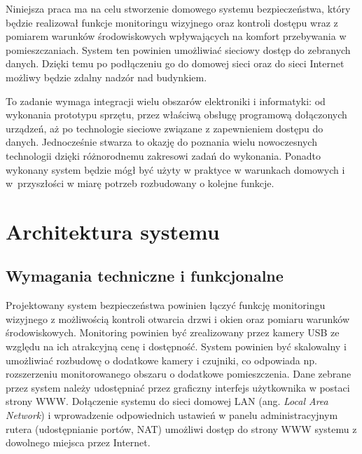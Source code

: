 \documentclass[a4paper,11pt,twoside]{article}
\begin{document}
Niniejsza praca ma na celu stworzenie domowego systemu bezpieczeństwa, który będzie realizował funkcje monitoringu wizyjnego oraz kontroli dostępu wraz z pomiarem warunków środowiskowych wpływających na komfort przebywania w pomieszczaniach. System ten powinien umożliwiać sieciowy dostęp do zebranych danych. Dzięki temu po podłączeniu go do domowej sieci oraz do sieci Internet możliwy będzie zdalny nadzór nad budynkiem. 

To zadanie wymaga integracji wielu obszarów elektroniki i informatyki: od wykonania prototypu sprzętu, przez właściwą obsługę programową dołączonych urządzeń, aż po technologie sieciowe związane z zapewnieniem dostępu do danych. Jednocześnie stwarza to okazję do poznania wielu nowoczesnych technologii dzięki różnorodnemu zakresowi zadań do wykonania. Ponadto wykonany system będzie mógł być użyty w praktyce w warunkach domowych i w~przyszłości w miarę potrzeb rozbudowany o kolejne funkcje.



\newpage
\section{Architektura systemu}

\subsection{Wymagania techniczne i funkcjonalne}
Projektowany system bezpieczeństwa powinien łączyć funkcję monitoringu wizyjnego z możliwością kontroli otwarcia drzwi i okien oraz pomiaru warunków środowiskowych. Monitoring powinien być zrealizowany przez kamery USB ze względu na ich atrakcyjną cenę i dostępność. System powinien być skalowalny i umożliwiać rozbudowę o dodatkowe kamery i czujniki, co odpowiada np. rozszerzeniu monitorowanego obszaru o dodatkowe pomieszczenia. Dane zebrane przez system należy udostępniać przez graficzny interfejs użytkownika w postaci strony WWW. Dołączenie systemu do sieci domowej LAN (ang. \textit{Local Area Network}) i wprowadzenie odpowiednich ustawień w panelu administracyjnym rutera (udostępnianie portów, NAT) umożliwi dostęp do strony WWW systemu z dowolnego miejsca przez Internet.
\end{document}
